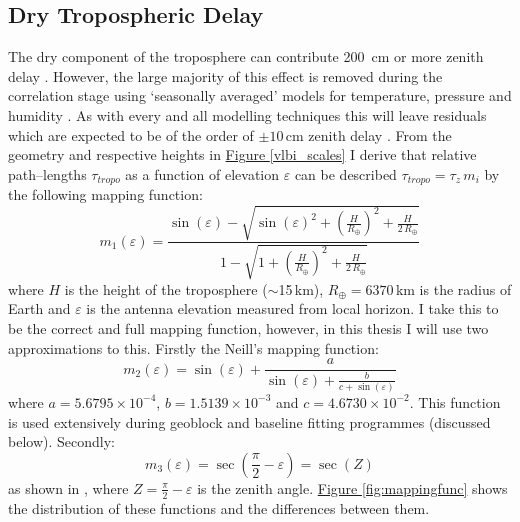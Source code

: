 	\subsection{Dry Tropospheric Delay} \label{sec:drytropotheory}
		The dry component of the troposphere can contribute 200~cm or more zenith delay \citep{ReidHonma2014}. However, the large majority of this effect is removed during the correlation stage using `seasonally averaged' models for temperature, pressure and humidity \citep{Deller2007}. As with every and all modelling techniques this will leave residuals which are expected to be of the order of $\pm10$\,cm zenith delay \citep{Reid2014}. From the geometry and respective heights in \hyperref[vlbi_scales]{Figure \ref*{vlbi_scales}} I derive that relative path--lengths $\tau_{tropo}$ as a function of elevation $\varepsilon$ can be described $\tau_{tropo} = \tau_z\,m_i$ by the following mapping function:
		\begin{equation}
		m_1(\varepsilon) = \frac{ \sin(\varepsilon)-\sqrt{\sin(\varepsilon)^2 + \left(\frac{H}{R_\oplus}\right)^2 + \frac{H}{2\,R_\oplus} }}{ 1-\sqrt{1 + \left(\frac{H}{R_\oplus}\right)^2 + \frac{H}{2\,R_\oplus} }}
		\label{eq:mappingfunction1}
		\end{equation} where $H$ is the height of the troposphere ($\sim$15\,km), $R_\oplus=6370$\,km is the radius of Earth and $\varepsilon$ is the antenna elevation measured from local horizon. I take this to be the correct and full mapping function, however, in this thesis I will use two approximations to this. Firstly the Neill's mapping function:		
		\begin{equation}
		m_2(\varepsilon) = \sin(\varepsilon)+\frac{a}{\sin(\varepsilon)+\frac{b}{c+\sin(\varepsilon)}}
		\label{eq:neills}
		\end{equation} where $a=5.6795\times10^{-4}$, $b=1.5139\times10^{-3}$ and $c=4.6730\times10^{-2}$. This function is used extensively during geoblock and baseline fitting programmes (discussed below). Secondly:
		\begin{equation}
		m_3(\varepsilon) = \sec\left({\frac{\pi}{2}-\varepsilon}\right) = \sec(Z)
		\label{eq:mappingfunction3}
		\end{equation} as shown in \citet{Honma2008}, where $Z=\frac{\pi}{2}-\varepsilon$ is the zenith angle. \hyperref[fig:mappingfunc]{Figure \ref*{fig:mappingfunc}} shows the distribution of these functions and the differences between them.
		
